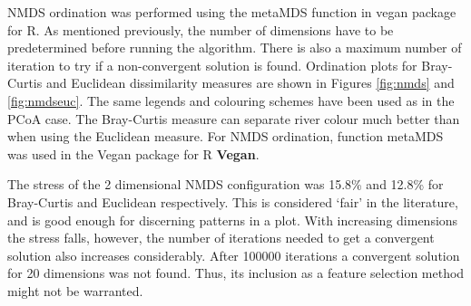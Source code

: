 NMDS ordination was performed using the metaMDS function in vegan \cite{oksanen_vegan_nodate} package for R. As mentioned previously, the number of dimensions have to be predetermined before running the algorithm. There is also a maximum number of iteration to try if a non-convergent solution is found. Ordination plots for Bray-Curtis and Euclidean dissimilarity measures are shown in Figures \ref{fig:nmds} and \ref{fig:nmdseuc}. The same legends and colouring schemes have been used as in the PCoA case. The Bray-Curtis measure can separate river colour much better than when using the Euclidean measure. For NMDS ordination, function metaMDS was used in the Vegan package for R \textbf{Vegan}. 


The stress of the 2 dimensional NMDS configuration was 15.8\% and 12.8\% for Bray-Curtis and Euclidean respectively. This is considered `fair' in the literature, and is good enough for discerning patterns in a plot. With increasing dimensions the stress falls, however, the number of iterations needed to get a convergent solution also increases considerably. After 100000 iterations a convergent solution for 20 dimensions was not found. Thus, its inclusion as a feature selection method might not be warranted. 

